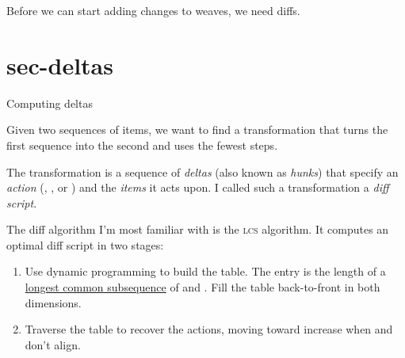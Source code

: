 \documentclass{article}
\begin{document}
Before we can start adding changes to weaves,
we need diffs.

\section{sec-deltas}{Computing deltas}

Given two sequences of items,
we want to find a transformation
that turns the first sequence into the second
and uses the fewest steps.

The transformation is a sequence of \emph{deltas}
(also known as \emph{hunks})
that specify an \emph{action} (, , or )
and the \emph{items} it acts upon.
I called such a transformation a \emph{diff script}.

The diff algorithm I'm most familiar with is the \textsc{lcs} algorithm.
It computes an optimal diff script in two stages:
\begin{enumerate}
\item
  Use dynamic programming to build the  table.
  The  entry is the length of a
  \href{https://en.wikipedia.org/wiki/Longest_common_subsequence}{longest common subsequence} of  and .
  Fill the table back-to-front in both dimensions.
\item
  Traverse the  table to recover the actions,
  moving toward  increase when  and  don't align.
\end{enumerate}
\end{document}
